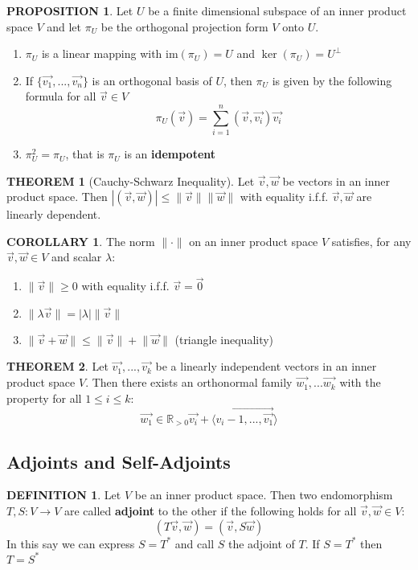 \documentclass[12pt]{article}
\theoremstyle{definition}
\newtheorem{definition}{DEFINITION}[subsection]
\newtheorem{theorem}{THEOREM}[subsection]
\newcommand{\norm}[1]{\lVert #1 \rVert}
\newcommand{\image}{\text{im}}
\newtheorem{prop}{PROPOSITION}[subsection]
\newtheorem{corollary}{COROLLARY}[subsection]
\begin{document}
\begin{prop}
    Let $U$ be a finite dimensional subspace of an inner product space $V$ and let $\pi_U$ be the orthogonal projection form $V$ onto $U$.
    \begin{enumerate}
        \item $\pi_U$ is a linear mapping with $\image(\pi_U) = U$ and $\ker(\pi_U) = U^\perp$
        \item If $\{\vec{v_1},..., \vec{v_n}\}$ is an orthogonal basis of $U$, then $\pi_U$ is given by the following formula for all $\vec{v} \in V$ $$\pi_U(\vec{v}) = \sum_{i=1}^n(\vec{v},\vec{v_i})\vec{v_i}$$
        \item $\pi_U^2 = \pi_U$, that is $\pi_U$ is an \textbf{idempotent}
    \end{enumerate}
\end{prop}

\begin{theorem}[Cauchy-Schwarz Inequality]
    Let $\vec{v}, \vec{w}$ be vectors in an inner product space. Then $|(\vec{v}, \vec{w})| \leq \norm{\vec{v}}\norm{\vec{w}}$ with equality i.f.f. $\vec{v}, \vec{w}$ are linearly dependent.
\end{theorem}

\begin{corollary}
    The norm $\norm{\cdot}$ on an inner product space $V$ satisfies, for any $\vec{v}, \vec{w}\in V$ and scalar $\lambda$:
    \begin{enumerate}
        \item $\norm{\vec{v}} \geq 0$ with equality i.f.f. $\vec{v} = \vec{0}$
        \item $\norm{\lambda\vec{v}} = |\lambda|\norm{\vec{v}}$
        \item $\norm{\vec{v}+ \vec{w}} \leq \norm{\vec{v}} + \norm{\vec{w}}$ (triangle inequality)
    \end{enumerate}
\end{corollary}

\begin{theorem}
    Let $\vec{v_1},..., \vec{v_k}$ be a linearly independent vectors in an inner product space $V$. Then there exists an orthonormal family $\vec{w_1},... \vec{w_k}$ with the property for all $1 \leq i \leq k$: $$\vec{w_1} \in \mathbb{R}_{>0}\vec{v_i}+ \langle\vec{v_i-1,...,\vec{v_1}}\rangle$$
\end{theorem}

\subsection{Adjoints and Self-Adjoints}
\begin{definition}
    Let $V$ be an inner product space. Then two endomorphism $T,S:V \rightarrow V$ are called \textbf{adjoint} to the other if the following holds for all $\vec{v}, \vec{w} \in V$: $$(T\vec{v}, \vec{w}) = (\vec{v}, S\vec{w})$$
    In this say we can express $S = T^*$ and call $S$ the adjoint of $T$. If $S = T^*$ then $T=S^*$
\end{definition}
\end{document}
